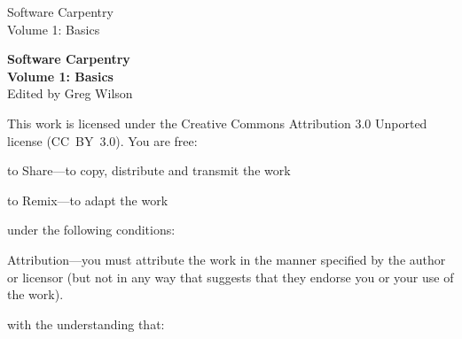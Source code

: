 \newpage

\thispagestyle{empty}
\begin{huge}
Software Carpentry \\
Volume 1: Basics
\end{huge}

\newpage

\thispagestyle{empty}

\small
\noindent \textbf{Software Carpentry\\Volume 1: Basics} \\
Edited by Greg Wilson

\vspace{0.15cm}

\noindent
This work is licensed under the Creative Commons Attribution 3.0
Unported license (CC~BY~3.0).  You are free:

\begin{swcitemize}
  \item to Share---to copy, distribute and transmit the work
  \item to Remix---to adapt the work
\end{swcitemize}

\noindent
under the following conditions:

\begin{swcitemize}
  \item Attribution---you must attribute the work in the manner
    specified by the author or licensor (but not in any way that
    suggests that they endorse you or your use of the work).
\end{swcitemize}

\noindent
with the understanding that:

